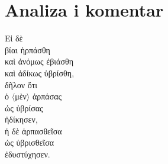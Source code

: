 \section*{Analiza i komentar}


{\large
\begin{greek}
\noindent Εἰ δὲ \\
\tabto{2em} βίαι ἡρπάσθη \\
\tabto{2em} καὶ ἀνόμως ἐβιάσθη \\
\tabto{2em} καὶ ἀδίκως ὑβρίσθη, \\
δῆλον ὅτι \\
ὁ $\langle$μὲν$\rangle$ ἁρπάσας \\
\tabto{2em} ὡς ὑβρίσας \\
ἠδίκησεν, \\
ἡ δὲ ἁρπασθεῖσα \\
\tabto{2em} ὡς ὑβρισθεῖσα \\
ἐδυστύχησεν.\\

\end{greek}
}

